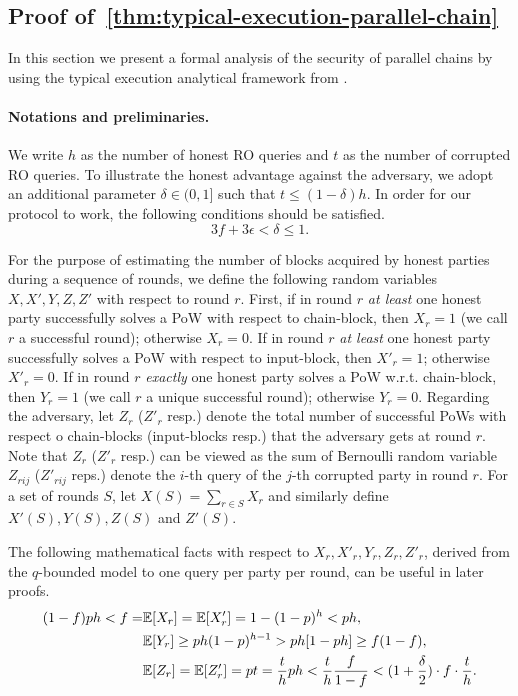 \subsection{Proof of~\cref*{thm:typical-execution-parallel-chain}}
\label{subsec:typical-exeuction-parallel-chains}

In this section we present a formal analysis of the security of parallel chains by using the typical execution analytical framework from \cite{EPRINT:GarKiaLeo14,C:GarKiaLeo17}.

\paragraph{Notations and preliminaries.}
%
We write $h$ as the number of honest RO queries and $t$ as the number of corrupted RO queries.
%
To illustrate the honest advantage against the adversary, we adopt an additional parameter $\delta \in (0, 1]$ such that $t \le (1 - \delta) h$.
%
In order for our protocol to work, the following conditions should be satisfied.
%
\begin{equation} \tag{C1} \label{condition:delta-advantage}
    3f + 3\epsilon < \delta \le 1.
\end{equation}

For the purpose of estimating the number of blocks acquired by honest parties during a sequence of rounds, we define the following random variables $X, X', Y, Z, Z'$ with respect to round $r$.
%
First, if in round $r$ \emph{at least} one honest party successfully solves a PoW with respect to chain-block, then $X_r = 1$ (we call $r$ a successful round); otherwise $X_r = 0$.
%
If in round $r$ \emph{at least} one honest party successfully solves a PoW with respect to input-block, then $X'_r = 1$; otherwise $X'_r = 0$.
%
If in round $r$ \emph{exactly} one honest party solves a PoW w.r.t. chain-block, then $Y_r = 1$ (we call $r$ a unique successful round); otherwise $Y_r = 0$.
%
Regarding the adversary, let $Z_r$ ($Z'_r$ resp.) denote the total number of successful PoWs with respect o chain-blocks (input-blocks resp.) that the adversary gets at round $r$.
%
Note that $Z_r$ ($Z'_r$ resp.) can be viewed as the sum of Bernoulli random variable $Z_{rij}$ ($Z'_{rij}$ reps.) denote the $i$-th query of the $j$-th corrupted party in round $r$.
%
For a set of rounds $S$, let $X(S) = \sum_{r \in S} X_r$ and similarly define $X'(S), Y(S), Z(S)$ and $Z'(S)$.

The following mathematical facts with respect to $X_r, X'_r, Y_r, Z_r, Z'_r$, derived from the $q$-bounded model \cite{EPRINT:GarKiaLeo14} to one query per party per round, can be useful in later proofs.
%
\begin{align*}
    (1 - f) p h < f = & \mathbb{E}[X_r] = \mathbb{E}[X'_r] = 1 - (1 - p)^{h} < p h,
    \\
                      & \mathbb{E}[Y_r] \ge p h (1 - p)^{h - 1} > p h [1 - p h] \ge f (1 - f),
    \\
                      & \mathbb{E}[Z_r] = \mathbb{E}[Z'_r] = p t = \frac{t}{h} p h < \frac{t}{h} \frac{f}{1 - f} < (1 + \frac{\delta}{2}) \cdot f \cdot \frac{t}{h}.
\end{align*}

